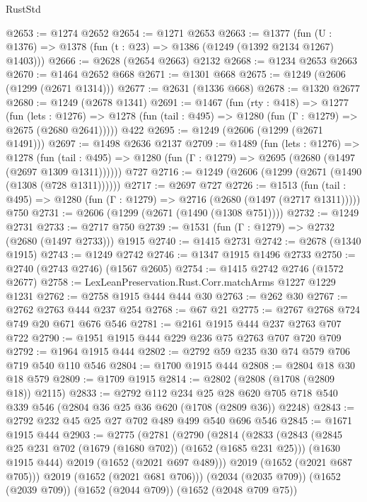 \begin{lexlean}{RustStd}
\begin{coremodule}
{\begin{coremodule}
{{{{{{{{{{{@2653 := @1274 @2652
@2654 := @1271 @2653
@2663 := @1377 (fun (U : @1376) => @1378 (fun (t : @23) => @1386 (@1249 (@1392 @2134 @1267) @1403)))
@2666 := @2628 (@2654 @2663) @2132
@2668 := @1234 @2653 @2663
@2670 := @1464 @2652 @668
@2671 := @1301 @668
@2675 := @1249 (@2606 (@1299 (@2671 @1314)))
@2677 := @2631 (@1336 @668)
@2678 := @1320 @2677
@2680 := @1249 (@2678 @1341)
@2691 := @1467
    (fun (rty : @418) =>
    @1277
      (fun (lets : @1276) =>
      @1278 (fun (tail : @495) => @1280 (fun (Γ : @1279) => @2675 (@2680 @2641)))))
    @422
@2695 := @1249 (@2606 (@1299 (@2671 @1491)))
@2697 := @1498 @2636 @2137
@2709 := @1489
    (fun (lets : @1276) =>
    @1278
      (fun (tail : @495) => @1280 (fun (Γ : @1279) => @2695 (@2680 (@1497 (@2697 @1309 @1311))))))
    @727
@2716 := @1249 (@2606 (@1299 (@2671 (@1490 (@1308 (@728 @1311))))))
@2717 := @2697 @727
@2726 := @1513
    (fun (tail : @495) => @1280 (fun (Γ : @1279) => @2716 (@2680 (@1497 (@2717 @1311)))))
    @750
@2731 := @2606 (@1299 (@2671 (@1490 (@1308 @751))))
@2732 := @1249 @2731
@2733 := @2717 @750
@2739 := @1531 (fun (Γ : @1279) => @2732 (@2680 (@1497 @2733))) @1915
@2740 := @1415 @2731
@2742 := @2678 (@1340 @1915)
@2743 := @1249 @2742
@2746 := @1347 @1915 @1496 @2733
@2750 := @2740 (@2743 @2746) (@1567 @2605)
@2754 := @1415 @2742 @2746 (@1572 @2677)
@2758 := LexLeanPreservation.Rust.Corr.matchArms @1227 @1229 @1231
@2762 := @2758 @1915 @444 @444 @30
@2763 := @262 @30
@2767 := @2762 @2763 @444 @237 @254
@2768 := @67 @21
@2775 := @2767 @2768 @724 @749 @20 @671 @676 @546
@2781 := @2161 @1915 @444 @237 @2763 @707 @722
@2790 := @1951 @1915 @444 @229 @236 @75 @2763 @707 @720 @709
@2792 := @1964 @1915 @444
@2802 := @2792 @59 @235 @30 @74 @579 @706 @719 @540 @110 @546
@2804 := @1700 @1915 @444
@2808 := @2804 @18 @30 @18 @579
@2809 := @1709 @1915
@2814 := @2802 (@2808 (@1708 (@2809 @18)) @2115)
@2833 := @2792
    @112
    @234
    @25
    @28
    @620
    @705
    @718
    @540
    @339
    @546
    (@2804 @36 @25 @36 @620 (@1708 (@2809 @36)) @2248)
@2843 := @2792 @232 @45 @25 @27 @702 @489 @499 @540 @696 @546
@2845 := @1671 @1915 @444
@2903 := @2775
    (@2781
      (@2790
        (@2814
          (@2833
            (@2843
              (@2845 @25 @231 @702 (@1679 (@1680 @702)) (@1652 (@1685 @231 @25)))
              (@1630 @1915 @444)
              @2019
              (@1652 (@2021 @697 @489)))
            @2019
            (@1652 (@2021 @687 @705)))
          @2019
          (@1652 (@2021 @681 @706)))
        (@2034 (@2035 @709))
        (@1652 (@2039 @709))
        (@1652 (@2044 @709))
        (@1652 (@2048 @709 @75))
}}}}}}}}}}}
\end{coremodule}}
\end{coremodule}
\end{lexlean}
